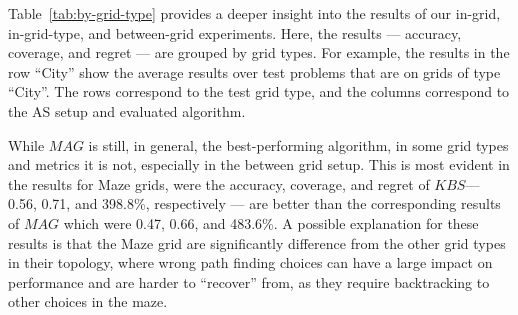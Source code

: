 \documentclass{ecai}
\newcommand{\kaduri}[1]{\ensuremath{\textit{KBS}}\xspace}
\newcommand{\mapfgas}[1]{\ensuremath{\textit{MAG}}\xspace}
\begin{document}









Table~\ref{tab:by-grid-type} provides a deeper insight into the results of our in-grid, in-grid-type, and between-grid experiments. 
Here, the results --- accuracy, coverage, and regret --- are grouped by grid types. 
For example, the results in the row ``City'' show the average results over test problems that are on grids of type ``City''. 
The rows correspond to the test grid type, and the columns correspond to the AS setup and evaluated algorithm. 


While \mapfgas\ is still, in general, the best-performing algorithm, in some grid types and metrics it is not, especially in the between grid setup. 
This is most evident in the results for Maze grids, were the accuracy, coverage, and regret of \kaduri\ --- 0.56, 0.71, and 398.8\%, respectively --- are better than the corresponding results of \mapfgas\, which were 0.47, 0.66, and 483.6\%. 
A possible explanation for these results is that the Maze grid are significantly difference from the other grid types in their topology, where wrong path finding choices can have a large impact on performance and are harder to ``recover'' from, as they require backtracking to other choices in the maze. 
\end{document}
